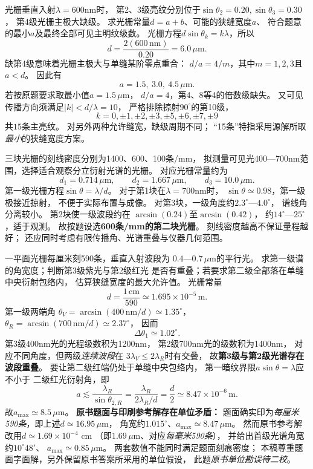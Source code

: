 \problemtext 光栅垂直入射$\lambda=600$nm时，
第2、3级亮纹分别位于$\sin\theta_2=0.20,\sin\theta_3=0.30$，
第4级光栅主极大缺级。
求光栅常量$d=a+b$、可能的狭缝宽度$a$、
符合题意的最小$a$及最终全部可见主明纹级数。
\workings
光栅方程$d\sin\theta_k=k\lambda$，所以
\[
\boxed{d=\frac{2(600\,\mathrm{nm})}{0.20}
=6.0\,\mu\mathrm m}.
\]
缺第4级意味着光栅主极大与单缝某阶零点重合：
$d/a=4/m$，其中$m=1,2,3$且$a<d$。
因此有
\[
\boxed{a=1.5,\ 3.0,\ 4.5\,\mu\mathrm m}.
\]
若按原题要求取最小值$a=1.5\,\mu$m，
$d/a=4$，第4、8等4的倍数级缺失。
又可见传播方向须满足$|k|<d/\lambda=10$，
严格排除掠射$90^\circ$的第10级，
\[
\boxed{k=0,\pm1,\pm2,\pm3,\pm5,\pm6,\pm7,\pm9}
\]
共$\boxed{15}$条主亮纹。
\crosscheck 对另外两种允许缝宽，缺级周期不同；
“15条”特指采用源解所取\emph{最小}的狭缝宽度方案。

\problemtext 三块光栅的刻线密度分别为1400、600、100条/mm，
拟测量可见光400—700nm范围，选择适合观察分立衍射光谱的光栅。
\workings
对应光栅常量约为
\[
d_1=0.714\,\mu\mathrm m,\qquad
d_2=1.667\,\mu\mathrm m,\qquad
d_3=10.0\,\mu\mathrm m.
\]
第一级光栅方程$\sin\theta=\lambda/d$。
对于第1块在$\lambda=700$nm时，
$\sin\theta\simeq0.98$，第一级极接近掠射，
不便于实际布置与成像。
对第3块，一级角度约$2.3^\circ$—$4.0^\circ$，
谱线角分离较小。
第2块使一级波段约在
$\arcsin(0.24)$至$\arcsin(0.42)$，
约$14^\circ$—$25^\circ$，适于观测。
故按题设选\textbf{600条/mm的第二块光栅}。
\crosscheck 刻线密度越高不保证量程越好；
还应同时考虑有限传播角、光谱重叠与仪器几何范围。

\problemtext 一平面光栅每厘米刻590条，垂直入射波段为
$0.4$—$0.7\,\mu$m的平行光。
求第一级谱的角宽度；判断第3级紫光与第2级红光
是否有重叠；若要求第二级全部落在单缝中央衍射包络内，
估算狭缝宽度的最大允许值。
\workings
光栅常量
\[
d=\frac{1\,\mathrm{cm}}{590}
\simeq1.695\times10^{-5}\,\mathrm m.
\]
第一级两端角
$\theta_V=\arcsin(400\,\mathrm{nm}/d)\simeq1.35^\circ$，
$\theta_R=\arcsin(700\,\mathrm{nm}/d)\simeq2.37^\circ$，
因而
\[
\boxed{\Delta\theta_1\simeq1.02^\circ}.
\]
第3级400nm光的光程级数积为1200nm，
第2级700nm光的级数积为1400nm，
对应不同角度，但两级\emph{连续波段}在
$3\lambda_V\le2\lambda_R$时有交叠，
故\textbf{第3级与第2级光谱存在波段重叠}。
要让第二级红端仍处于单缝中央包络内，
第一暗纹界限$a\sin\theta=\lambda$应不小于
二级红光衍射角，即
\[
a\lesssim\frac{\lambda_R}{\sin\theta_{2,R}}
=\frac{\lambda_R}{2\lambda_R/d}
=\frac d2
\simeq8.47\times10^{-6}\,\mathrm m.
\]
故$\boxed{a_{\max}\simeq8.5\,\mu\mathrm m}$。
\crosscheck \textbf{原书题面与印刷参考解存在单位矛盾：}
题面确实印为\emph{每厘米590条}，即上述$d\simeq16.95\,\mu$m，
角宽约$1.015^\circ$、$a_{\max}\simeq8.47\,\mu$m。
然而原书参考解改用$d\simeq1.69\times10^{-4}$ cm
（即$1.69\,\mu$m、对应\emph{每毫米590条}），
并给出首级光谱角宽约$10^\circ48'$、
$a_{\max}\simeq0.85\,\mu$m。
两套数值不能同时满足题面刻痕密度；
本稿尊重题面字面解，另外保留原书答案所采用的单位假设，
此题\emph{原书单位勘误待二校}。


